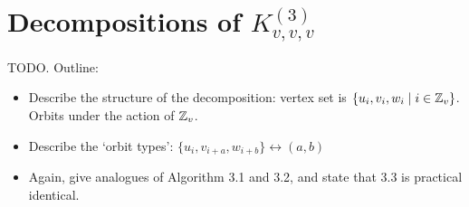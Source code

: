 \section{Decompositions of $K_{v,v,v}^{(3)}$}

TODO. Outline:

\begin{itemize}
    \item Describe the structure of the decomposition: vertex set is $\{u_i, v_i, w_i \mid i \in \mathbb{Z}_v\}$. Orbits under the action of $\mathbb{Z}_v$.
    \item Describe the `orbit types': $\{u_i, v_{i+a}, w_{i+b}\} \leftrightarrow (a, b)$
    \item Again, give analogues of Algorithm 3.1 and 3.2, and state that 3.3 is practical identical.
\end{itemize}
